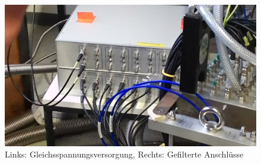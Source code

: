 \documentclass[DIN, pagenumber=false, fontsize=11pt]{scrartcl}
\begin{document}

\begin{figure}[h]
\begin{center}
 \includegraphics[width=\textwidth]{pictures/P_20150225_142923.jpg} \qquad
 \caption{Links: Gleichsspannungsversorgung, Rechts: Gefilterte Anschlüsse}
\end{center}
\end{figure}
\end{document}
